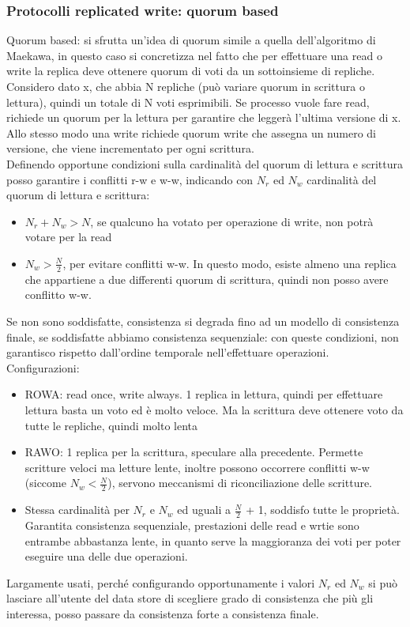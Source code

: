 \documentclass[16px]{article}
\begin{document}
\subsubsection{Protocolli replicated write: quorum based}
Quorum based: si sfrutta un'idea di quorum simile a quella dell'algoritmo di Maekawa, in questo caso si concretizza nel fatto che per effettuare una read o write la replica deve ottenere quorum di voti da un sottoinsieme di repliche.\\ Considero dato x, che abbia N repliche (può variare quorum in scrittura o lettura), quindi un totale di N voti esprimibili. Se processo vuole fare read, richiede un quorum per la lettura per garantire che leggerà l'ultima versione di x. Allo stesso modo una write richiede quorum write che assegna un numero di versione, che viene incrementato per ogni scrittura.\\ Definendo opportune condizioni sulla cardinalità del quorum di lettura e scrittura posso garantire i conflitti r-w e w-w, indicando con $N_r$ ed $N_w$ cardinalità del quorum di lettura e scrittura:
\begin{itemize}
\item $N_r + N_w > N$, se qualcuno ha votato per operazione di write, non potrà votare per la read
\item $N_w > \frac{N}{2}$, per evitare conflitti w-w. In questo modo, esiste almeno una replica che appartiene a due differenti quorum di scrittura, quindi non posso avere conflitto w-w.
\end{itemize}
Se non sono soddisfatte, consistenza si degrada fino ad un modello di consistenza finale, se soddisfatte abbiamo consistenza sequenziale: con queste condizioni, non garantisco rispetto dall'ordine temporale nell'effettuare operazioni.\\ Configurazioni:
\begin{itemize}
\item ROWA: read once, write always. 1 replica in lettura, quindi per effettuare lettura basta un voto ed è molto veloce. Ma la scrittura deve ottenere voto da tutte le repliche, quindi molto lenta
\item RAWO: 1 replica per la scrittura, speculare alla precedente. Permette scritture veloci ma letture lente, inoltre possono occorrere conflitti w-w (siccome $N_w < \frac{N}{2}$), servono meccanismi di riconciliazione delle scritture.
\item Stessa cardinalità per $N_r$ e $N_w$ ed uguali a $\frac{N}{2}$ + 1, soddisfo tutte le proprietà. Garantita consistenza sequenziale, prestazioni delle read e wrtie sono entrambe abbastanza lente, in quanto serve la maggioranza dei voti per poter eseguire una delle due operazioni.
\end{itemize}
Largamente usati, perché configurando opportunamente i valori $N_r$ ed $N_w$ si può lasciare all'utente del data store di scegliere grado di consistenza che più gli interessa, posso passare da consistenza forte a consistenza finale.
\end{document}
